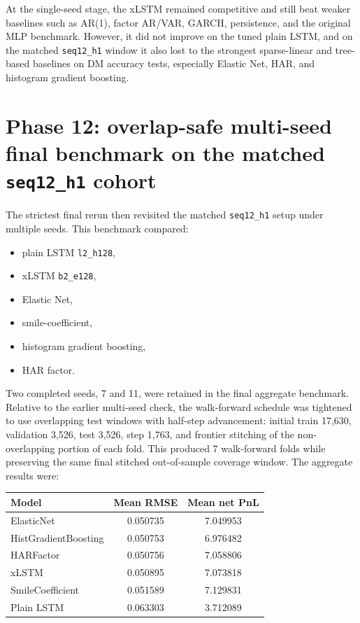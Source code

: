 \documentclass[12pt]{report}
\begin{document}
At the single-seed stage, the xLSTM remained competitive and still beat weaker baselines such as AR(1), factor AR/VAR, GARCH, persistence, and the original MLP benchmark. However, it did not improve on the tuned plain LSTM, and on the matched \texttt{seq12\_h1} window it also lost to the strongest sparse-linear and tree-based baselines on DM accuracy tests, especially Elastic Net, HAR, and histogram gradient boosting.

\section{Phase 12: overlap-safe multi-seed final benchmark on the matched \texttt{seq12\_h1} cohort}
The strictest final rerun then revisited the matched \texttt{seq12\_h1} setup under multiple seeds. This benchmark compared:
\begin{itemize}[leftmargin=1.2cm]
    \item plain LSTM \texttt{l2\_h128},
    \item xLSTM \texttt{b2\_e128},
    \item Elastic Net,
    \item smile-coefficient,
    \item histogram gradient boosting,
    \item HAR factor.
\end{itemize}

Two completed seeds, 7 and 11, were retained in the final aggregate benchmark. Relative to the earlier multi-seed check, the walk-forward schedule was tightened to use overlapping test windows with half-step advancement: initial train 17,630, validation 3,526, test 3,526, step 1,763, and frontier stitching of the non-overlapping portion of each fold. This produced 7 walk-forward folds while preserving the same final stitched out-of-sample coverage window. The aggregate results were:
\begin{center}
\begin{tabular}{lcc}
\toprule
Model & Mean RMSE & Mean net PnL \\
\midrule
ElasticNet & 0.050735 & 7.049953 \\
HistGradientBoosting & 0.050753 & 6.976482 \\
HARFactor & 0.050756 & 7.058806 \\
xLSTM & 0.050895 & 7.073818 \\
SmileCoefficient & 0.051589 & 7.129831 \\
Plain LSTM & 0.063303 & 3.712089 \\
\bottomrule
\end{tabular}
\end{center}
\end{document}
